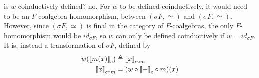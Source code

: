 is $w$ coinductively defined? no. For $w$ to be defined coinductively, it would need to be an $F$-coalgebra homomorphism, between $(\sigma F,\simeq)$ and $(\sigma F,\simeq)$. However, since $(\sigma F,\simeq)$ is final in the category of $F$-coalgebras, the only $F$-homomorphism would be $id_{\sigma F}$, so $w$ can only be defined coinductively if $w=id_{\sigma F}$. It is, instead a transformation of $\sigma F$, defined by 
\begin{align}
    w({{\llbracket m(x)\rrbracket}}_{c})&\triangleq{{\llbracket x\rrbracket}}_{c\circ m}\\
    {{\llbracket x\rrbracket}}_{c\circ m}&=(w\circ{{\llbracket-\rrbracket}}_{c}\circ m)(x)
\end{align}

